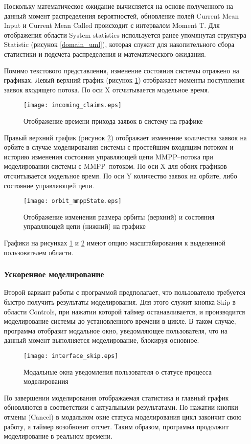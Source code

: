 Поскольку математическое ожидание вычисляется на основе полученного на данный момент распределения вероятностей, обновление полей Current Mean Input и Current Mean Called происходит с интервалом Moment T. Для отображения области System statistics используется ранее упомянутая структура Statistic (рисунок \ref {domain_uml}), которая служит для накопительного сбора статистики и подсчета распределения и математического ожидания. 

Помимо текстового представления, изменение состояния системы отражено на графиках. Левый верхний график (рисунок \ref{interface_incoming_claims}) отображает моменты поступления заявок входящего потока. По оси X отсчитывается модельное время.
   \begin{figure}[H]
	\centering
	\texttt{[image: incoming\_claims.eps]}
	\caption{Отображение времени прихода заявок в систему на графике}
	\label{interface_incoming_claims}
\end{figure}
Правый верхний график (рисунок \ref{interface_orbit_mmpp}) отображает изменение количества заявок на орбите в случае моделирования системы с простейшим входящим потоком и историю изменения состояния управляющей цепи MMPP--потока при моделировании системы с MMPP--потоком. По оси X для обоих графиков отсчитывается модельное время. По оси Y количество заявок на орбите, либо состояние управляющей цепи.

   \begin{figure}[H]
	\centering
	\texttt{[image: orbit\_mmppState.eps]}
	\caption{Отображение изменения размера орбиты (верхний) и состояния управляющей цепи (нижний) на графике}
	\label{interface_orbit_mmpp}
\end{figure}
Графики на рисунках \ref{interface_incoming_claims} и \ref{interface_orbit_mmpp} имеют опцию масштабирования к выделенной пользователем области.
\subsubsection{Ускоренное моделирование }
Второй вариант работы с программой предполагает, что пользователю требуется быстро получить результаты моделирования. Для этого служит кнопка Skip в области Controls, при нажатии которой таймер останавливается, и производится моделирование системы до установленного времени в цикле. В таком случае, программа отобразит модальное окно, уведомляющее пользователя, что на данный момент выполняется моделирование, блокируя основное.
 \begin{figure}[H]
	\centering
	\texttt{[image: interface\_skip.eps]}
	\caption{Модальные окна уведомления пользователя о статусе процесса моделирования}
	\label{interface_skip}
\end{figure}
По завершении моделирования отображаемая статистика и главный график обновляются в соответствии с актуальными результатами. По нажатии кнопки отмены (Cancel) в модальном окне статуса моделирования цикл закончит свою работу, а таймер возобновит отсчет. Таким образом, программа продолжит моделирование в реальном времени.  

